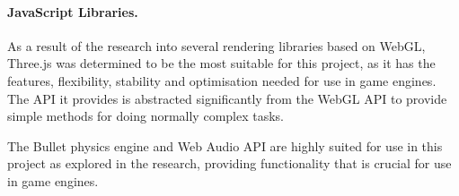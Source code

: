 \paragraph{JavaScript Libraries.}
As a result of the research into several rendering libraries based on WebGL, Three.js was determined to be the most suitable for this project, as it has the features, flexibility, stability and optimisation needed for use in game engines. The API it provides is abstracted significantly from the WebGL API to provide simple methods for doing normally complex tasks.

The Bullet physics engine and Web Audio API are highly suited for use in this project as explored in the research, providing functionality that is crucial for use in game engines.


% 	

